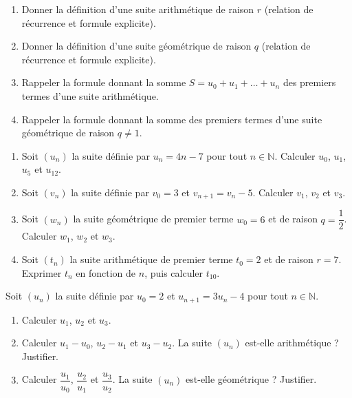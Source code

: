 \documentclass[11pt]{article}
\newcounter{popsec}
\newcounter{popsub}
\newcommand{\courssub}[1]{%
  \stepcounter{popsub}%
  \par\vspace{9pt}\noindent{\popxbold\fontsize{11.5}{13}\selectfont\color{popink}{\color{poporange}\thepopsec.\thepopsub}\hspace{6pt}#1}\par\nopagebreak\vspace{4pt}
}
\begin{document}
\begin{exercice}
\begin{enumerate}
\item Donner la définition d'une suite arithmétique de raison $r$ (relation de récurrence et formule explicite).
\item Donner la définition d'une suite géométrique de raison $q$ (relation de récurrence et formule explicite).
\item Rappeler la formule donnant la somme $S = u_0 + u_1 + \dots + u_n$ des premiers termes d'une suite arithmétique.
\item Rappeler la formule donnant la somme des premiers termes d'une suite géométrique de raison $q \neq 1$.
\end{enumerate}
\end{exercice}

\begin{exercice}
\begin{enumerate}
\item Soit $(u_n)$ la suite définie par $u_n = 4n - 7$ pour tout $n \in \mathbb{N}$. Calculer $u_0$, $u_1$, $u_5$ et $u_{12}$.
\item Soit $(v_n)$ la suite définie par $v_0 = 3$ et $v_{n+1} = v_n - 5$. Calculer $v_1$, $v_2$ et $v_3$.
\item Soit $(w_n)$ la suite géométrique de premier terme $w_0 = 6$ et de raison $q = \dfrac{1}{2}$. Calculer $w_1$, $w_2$ et $w_3$.
\item Soit $(t_n)$ la suite arithmétique de premier terme $t_0 = 2$ et de raison $r = 7$. Exprimer $t_n$ en fonction de $n$, puis calculer $t_{10}$.
\end{enumerate}
\end{exercice}

\courssub{Je m'entraîne}

\begin{exercice}
Soit $(u_n)$ la suite définie par $u_0 = 2$ et $u_{n+1} = 3u_n - 4$ pour tout $n \in \mathbb{N}$.
\begin{enumerate}
\item Calculer $u_1$, $u_2$ et $u_3$.
\item Calculer $u_1 - u_0$, $u_2 - u_1$ et $u_3 - u_2$. La suite $(u_n)$ est-elle arithmétique ? Justifier.
\item Calculer $\dfrac{u_1}{u_0}$, $\dfrac{u_2}{u_1}$ et $\dfrac{u_3}{u_2}$. La suite $(u_n)$ est-elle géométrique ? Justifier.
\end{enumerate}
\end{exercice}
\end{document}

